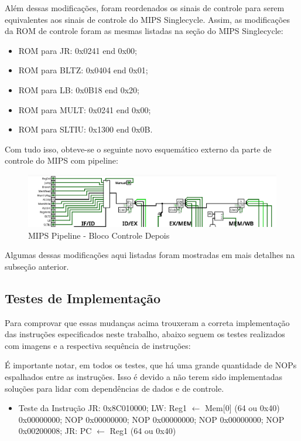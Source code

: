 \documentclass{report}
\begin{document}
        Além dessas modificações, foram reordenados os sinais de controle para serem equivalentes aos sinais de controle do MIPS Singlecycle.
        Assim, as modificações da ROM de controle foram as mesmas listadas na seção do MIPS Singlecycle:
        \begin{itemize}
            \item ROM para JR: 0x0241 end 0x00;
            \item ROM para BLTZ: 0x0404 end 0x01;
            \item ROM para LB: 0x0B18 end 0x20;
            \item ROM para MULT: 0x0241 end 0x00;
            \item ROM para SLTIU: 0x1300 end 0x0B.
        \end{itemize}

        Com tudo isso, obteve-se o seguinte novo esquemático externo da parte de controle do MIPS com pipeline:
        \begin{figure}[h!]
            \centering
            \includegraphics[width=\linewidth]{images/prints/Pipeline/Bloco de Controle Pipeline Depois.png}
            \caption{\label{print:pipeline_cb_after} MIPS Pipeline - Bloco Controle Depois}
        \end{figure}

        Algumas dessas modificações aqui listadas foram mostradas em mais detalhes na subseção anterior.

        \subsection{Testes de Implementação}
        Para comprovar que essas mudanças acima trouxeram a correta implementação das instruções especificados neste trabalho,
        abaixo seguem os testes realizados com imagens e a respectiva sequência de instruções:
        
        É importante notar, em todos os testes, que há uma grande quantidade de NOPs espalhados entre as instruções. Isso é devido
        a não terem sido implementadas soluções para lidar com dependências de dados e de controle.

        \begin{itemize}
            \item Teste da Instrução JR:
                \subitem 0x8C010000; LW: Reg1 $\leftarrow$ Mem[0] (64 ou 0x40)
                \subitem 0x00000000; NOP
                \subitem 0x00000000; NOP
                \subitem 0x00000000; NOP
                \subitem 0x00000000; NOP
                \subitem 0x00200008; JR: PC $\leftarrow$ Reg1 (64 ou 0x40)
        \end{itemize}
        
\end{document}
